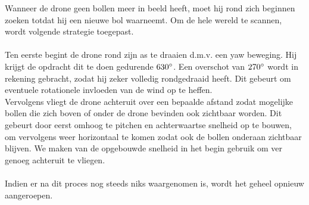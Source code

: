 \noindent
Wanneer de drone geen bollen meer in beeld heeft, moet hij rond zich beginnen zoeken totdat hij een nieuwe bol waarneemt. Om de hele wereld te scannen, wordt volgende strategie toegepast.
\\
\\
Ten eerste begint de drone rond zijn as te draaien d.m.v. een yaw beweging. Hij krijgt de opdracht dit te doen gedurende \(630\degree\). Een overschot van \(270\degree\) wordt in rekening gebracht, zodat hij zeker volledig rondgedraaid heeft. Dit gebeurt om eventuele rotationele invloeden van de wind op te heffen.
\\
Vervolgens vliegt de drone achteruit over een bepaalde afstand zodat mogelijke bollen die zich boven of onder de drone bevinden ook zichtbaar worden. Dit gebeurt door eerst omhoog te pitchen en achterwaartse snelheid op te bouwen, om vervolgens weer horizontaal te komen zodat ook de bollen onderaan zichtbaar blijven. We maken van de opgebouwde snelheid in het begin gebruik om ver genoeg achteruit te vliegen.
\\
\\
Indien er na dit proces nog steeds niks waargenomen is, wordt het geheel opnieuw aangeroepen. 